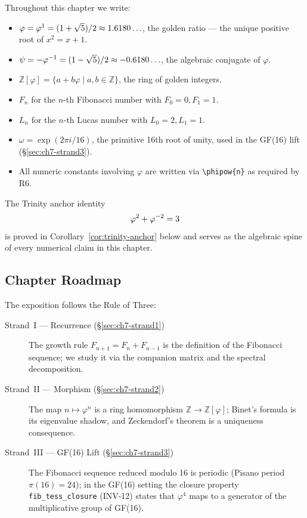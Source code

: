 Throughout this chapter we write:
\begin{itemize}
  \item \(\varphi = \varphi^{1} = (1+\sqrt{5})/2 \approx 1.6180\ldots\),
        the golden ratio — the unique positive root of \(x^2 = x + 1\).
  \item \(\psi = -\varphi^{-1} = (1-\sqrt{5})/2 \approx -0.6180\ldots\),
        the algebraic conjugate of \(\varphi\).
  \item \(\mathbb{Z}[\varphi] = \{a + b\varphi \mid a, b \in \mathbb{Z}\}\),
        the ring of golden integers.
  \item \(F_n\) for the \(n\)-th Fibonacci number with \(F_0=0, F_1=1\).
  \item \(L_n\) for the \(n\)-th Lucas number with \(L_0=2, L_1=1\).
  \item \(\omega = \exp(2\pi i/16)\), the primitive 16th root of unity,
        used in the GF(16) lift (\S\ref{sec:ch7-strand3}).
  \item All numeric constants involving \(\varphi\) are written via
        \verb|\phipow{n}| as required by R6.
\end{itemize}

The Trinity anchor identity
\[
  \varphi^{2} + \varphi^{-2} = 3
\]
is proved in Corollary~\ref{cor:trinity-anchor} below and serves as the
algebraic spine of every numerical claim in this chapter.

\subsection{Chapter Roadmap}\label{subsec:ch7-roadmap}

The exposition follows the Rule of Three:

\begin{description}
  \item[Strand~I — Recurrence (§\ref{sec:ch7-strand1})]
        The growth rule \(F_{n+1} = F_n + F_{n-1}\) is the definition of
        the Fibonacci sequence; we study it via the companion matrix and
        the spectral decomposition.
  \item[Strand~II — Morphism (§\ref{sec:ch7-strand2})]
        The map \(n \mapsto \varphi^n\) is a ring homomorphism
        \(\mathbb{Z} \to \mathbb{Z}[\varphi]\); Binet's formula is its
        eigenvalue shadow, and Zeckendorf's theorem is a uniqueness
        consequence.
  \item[Strand~III — GF(16) Lift (§\ref{sec:ch7-strand3})]
        The Fibonacci sequence reduced modulo 16 is periodic (Pisano period
        \(\pi(16) = 24\)); in the GF(16) setting the closure property
        \texttt{fib\_tess\_closure} (INV-12) states that \(\varphi^4\)
        maps to a generator of the multiplicative group of GF(16).
\end{description}

